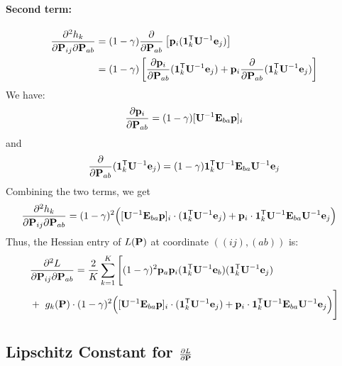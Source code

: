 \paragraph{Second term:}
\begin{align*}
\frac{\partial^2 h_k}{\partial \mathbf{{P}}_{ij} \partial \mathbf{{P}}_{ab}}
&= (1-\gamma) \frac{\partial}{\partial \mathbf{{P}}_{ab}} \left[ \mathbf{{p}}_i (\mathbf{{1}}_{k}^{\mathsf{T}} \mathbf{{U}}^{-1} \mathbf{{e}}_j) \right] \\
&= (1-\gamma) \left[
    \frac{\partial \mathbf{{p}}_i}{\partial \mathbf{{P}}_{ab}} (\mathbf{{1}}_{k}^{\mathsf{T}} \mathbf{{U}}^{-1} \mathbf{{e}}_j)
    + \mathbf{{p}}_i \frac{\partial}{\partial \mathbf{{P}}_{ab}} (\mathbf{{1}}_{k}^{\mathsf{T}} \mathbf{{U}}^{-1} \mathbf{{e}}_j)
\right]
\end{align*}
We have:
\[
\frac{\partial \mathbf{{p}}_i}{\partial \mathbf{{P}}_{ab}} = (1-\gamma) [\mathbf{{U}}^{-1} \mathbf{{E}}_{ba} \mathbf{{p}}]_i
\]
and
\[
\frac{\partial}{\partial \mathbf{{P}}_{ab}} (\mathbf{{1}}_{k}^{\mathsf{T}} \mathbf{{U}}^{-1} \mathbf{{e}}_j) = (1-\gamma) \mathbf{{1}}_{k}^{\mathsf{T}} \mathbf{{U}}^{-1} \mathbf{{E}}_{ba} \mathbf{{U}}^{-1} \mathbf{{e}}_j
\]
{Combining the two terms, we get}
\begin{align*}
\frac{\partial^2 h_k}{\partial \mathbf{{P}}_{ij} \partial \mathbf{{P}}_{ab}} &=
(1-\gamma)^2 \Big(
    [\mathbf{{U}}^{-1} \mathbf{{E}}_{ba} \mathbf{{p}}]_i \cdot (\mathbf{{1}}_{k}^{\mathsf{T}} \mathbf{{U}}^{-1} \mathbf{{e}}_j)
    + \mathbf{{p}}_i \cdot \mathbf{{1}}_{k}^{\mathsf{T}} \mathbf{{U}}^{-1} \mathbf{{E}}_{ba} \mathbf{{U}}^{-1} \mathbf{{e}}_j
\Big)
\end{align*}
Thus, the Hessian entry of $L(\mathbf{{P}})$ at coordinate $((ij), (ab))$ is:
\begin{align}
\label{eq:hessian}
    & \frac{\partial^2 L}{\partial \mathbf{{P}}_{ij} \partial \mathbf{{P}}_{ab}}
= \frac{2}{K} \sum_{k=1}^K \Bigg[
        (1-\gamma)^2 \mathbf{{p}}_a \mathbf{{p}}_i (\mathbf{{1}}_{k}^{\mathsf{T}} \mathbf{{U}}^{-1} \mathbf{{e}}_b)(\mathbf{{1}}_{k}^{\mathsf{T}} \mathbf{{U}}^{-1} \mathbf{{e}}_j)\\ \nonumber
    &+\ g_k(\mathbf{{P}}) \cdot (1-\gamma)^2 \Big(
        [\mathbf{{U}}^{-1} \mathbf{{E}}_{ba} \mathbf{{p}}]_i \cdot (\mathbf{{1}}_{k}^{\mathsf{T}} \mathbf{{U}}^{-1} \mathbf{{e}}_j)
        + \mathbf{{p}}_i \cdot \mathbf{{1}}_{k}^{\mathsf{T}} \mathbf{{U}}^{-1} \mathbf{{E}}_{ba} \mathbf{{U}}^{-1} \mathbf{{e}}_j
    \Big)
\Bigg]
\end{align}


\subsection{\texorpdfstring{Lipschitz Constant for $\tfrac{\partial L}{\partial \mathbf{{P}}}$}{Lipschitz Constant for dL/d$\transmatrix$}}



